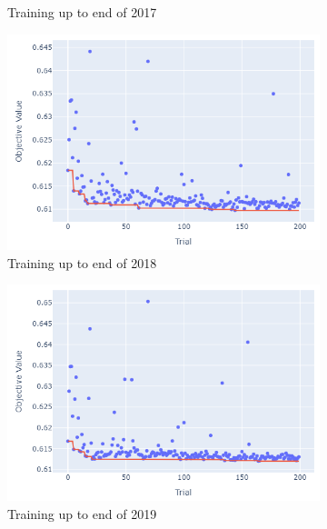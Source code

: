 \documentclass[12pt,twoside]{report}
\begin{document}
\begin{figure}[htb]
\begin{subfigure}{.33\linewidth}
  \caption{Training up to end of 2017}
\end{subfigure}%
\begin{subfigure}{.33\linewidth}
  \centering
  \includegraphics[width=0.95\linewidth]{figures/lightgbm_no_odds_cutoff_2018.png}
  \caption{Training up to end of 2018}
\end{subfigure}
\par\bigskip
\par\bigskip
\begin{subfigure}{.33\linewidth}
  \centering
  \includegraphics[width=0.95\linewidth]{figures/lightgbm_no_odds_cutoff_2019.png}
  \caption{Training up to end of 2019}
\end{subfigure}%
\begin{subfigure}{.33\linewidth}
  \centering

\end{subfigure}
\end{figure}
\end{document}
